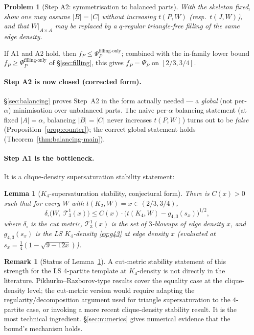 \documentclass[11pt]{amsart}
\newtheorem{lemma}[theorem]{Lemma}
\newtheorem{problem}[theorem]{Problem}
\theoremstyle{definition}
\newtheorem{remark}[theorem]{Remark}
\newcommand{\1}{\mathbf 1}
\begin{document}
\begin{problem}[Step A2: symmetrisation to balanced parts]
\label{prob:A2}
With the skeleton fixed, show one may assume $|B|=|C|$ without increasing
$t(P,W)$ (resp.\ $t(J,W)$), and that $W|_{A\times A}$ may be replaced by a
$q$-regular triangle-free filling of the same edge density.
\end{problem}

If A1 and A2 hold, then $f_P\le\Psi_P^{\text{filling-only}}$; combined with the
in-family lower bound $f_P\ge\Psi_P^{\text{filling-only}}$ of
\S\ref{sec:filling}, this gives $f_P=\Psi_P$ on $[2/3,3/4]$.

\paragraph{Step A2 is now closed (corrected form).}  \S\ref{sec:balancing}
proves Step~A2 in the form actually needed --- a \emph{global} (not per-$\alpha$)
minimisation over unbalanced parts.  The naive per-$\alpha$ balancing statement
(at fixed $|A|=\alpha$, balancing $|B|=|C|$ never increases $t(P,W)$) turns out to
be \emph{false} (Proposition~\ref{prop:counter}); the correct global statement
holds (Theorem~\ref{thm:balancing-main}).

\paragraph{Step A1 is the bottleneck.}  It is a clique-density supersaturation
stability statement:

\begin{lemma}[$K_4$-supersaturation stability, conjectural form]
\label{lem:K4-stability}
There is $C(x)>0$ such that for every $W$ with $t(K_2,W)=x\in(2/3,3/4)$,
\[
   \delta_\square\bigl(W,\ \mathcal{T}_{3}^{1}(x)\bigr)
   \le C(x)\cdot \bigl(t(K_4,W) - g_{4,3}(s_x)\bigr)^{1/2},
\]
where $\delta_\square$ is the cut metric, $\mathcal T_3^1(x)$ is the set of
$3$-blowups of edge density $x$, and $g_{4,3}(s_x)$ is the LS $K_4$-density
\eqref{eq:g43} at edge density $x$ (evaluated at $s_x=\tfrac14(1-\sqrt{9-12x})$).
\end{lemma}

\begin{remark}[Status of Lemma~\ref{lem:K4-stability}]
A cut-metric stability statement of this strength for the LS $4$-partite template
at $K_4$-density is not directly in the literature.  Pikhurko--Razborov-type
results \cite{PikhurkoRazborov} cover the equality case at the clique-density
level; the cut-metric version would require adapting the
regularity/decomposition argument used for triangle supersaturation to the
$4$-partite case, or invoking a more recent clique-density stability result.  It
is the most technical ingredient.  \S\ref{sec:numerics} gives numerical evidence
that the bound's mechanism holds.
\end{remark}
\end{document}
